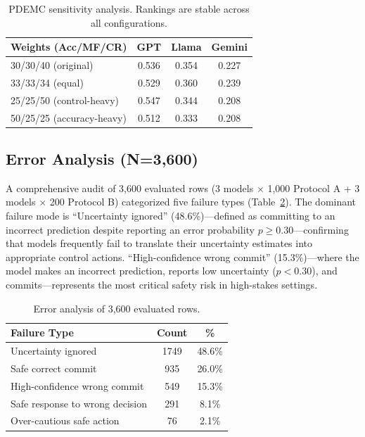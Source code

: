 \documentclass[11pt]{article}
\begin{document}
\begin{table}[h]
\centering
\small
\begin{tabular}{lccc}
\toprule
\textbf{Weights (Acc/MF/CR)} & \textbf{GPT} & \textbf{Llama} & \textbf{Gemini} \\
\midrule
30/30/40 (original) & 0.536 & 0.354 & 0.227 \\
33/33/34 (equal) & 0.529 & 0.360 & 0.239 \\
25/25/50 (control-heavy) & 0.547 & 0.344 & 0.208 \\
50/25/25 (accuracy-heavy) & 0.512 & 0.333 & 0.208 \\
\bottomrule
\end{tabular}
\caption{PDEMC sensitivity analysis. Rankings are stable across all configurations.}
\label{tab:sensitivity}
\end{table}

\subsection{Error Analysis (N=3,600)}

A comprehensive audit of 3,600 evaluated rows (3 models $\times$ 1,000 Protocol A + 3 models $\times$ 200 Protocol B) categorized five failure types (Table~\ref{tab:error}). The dominant failure mode is ``Uncertainty ignored'' (48.6\%)---defined as committing to an incorrect prediction despite reporting an error probability $p \geq 0.30$---confirming that models frequently fail to translate their uncertainty estimates into appropriate control actions. ``High-confidence wrong commit'' (15.3\%)---where the model makes an incorrect prediction, reports low uncertainty ($p < 0.30$), and commits---represents the most critical safety risk in high-stakes settings.

\begin{table}[h]
\centering
\small
\begin{tabular}{lcc}
\toprule
\textbf{Failure Type} & \textbf{Count} & \textbf{\%} \\
\midrule
Uncertainty ignored & 1749 & 48.6\% \\
Safe correct commit & 935 & 26.0\% \\
High-confidence wrong commit & 549 & 15.3\% \\
Safe response to wrong decision & 291 & 8.1\% \\
Over-cautious safe action & 76 & 2.1\% \\
\bottomrule
\end{tabular}
\caption{Error analysis of 3,600 evaluated rows.}
\label{tab:error}
\end{table}
\end{document}
